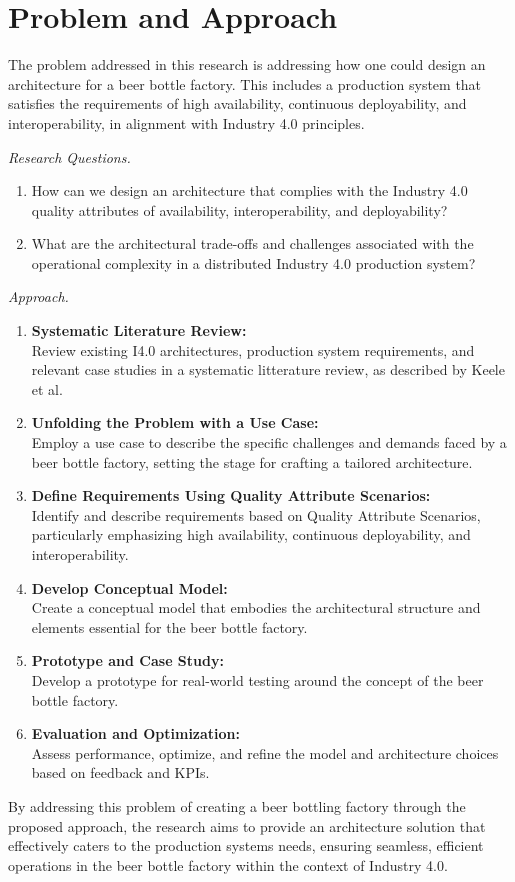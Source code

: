 \section{Problem and Approach}

\label{sec:problem}

The problem addressed in this research is addressing how one could design an architecture for a beer bottle factory. This includes a production system that satisfies the requirements of high availability, continuous deployability, and interoperability, in alignment with Industry 4.0 principles.

\emph{Research Questions.}
\begin{enumerate}
    \item How can we design an architecture that complies with the Industry 4.0 quality attributes of availability, interoperability, and deployability?
    \item What are the architectural trade-offs and challenges associated with the operational complexity in a distributed Industry 4.0 production system?
\end{enumerate}

\emph{Approach.}
\begin{enumerate}
    \item \textbf{Systematic Literature Review:}\\
    Review existing I4.0 architectures, production system requirements, and relevant case studies in a systematic litterature review, as described by Keele et al. \cite{keele2007guidelines}
    \item \textbf{Unfolding the Problem with a Use Case:}\\
    Employ a use case to describe the specific challenges and demands faced by a beer bottle factory, setting the stage for crafting a tailored architecture.
    \item \textbf{Define Requirements Using Quality Attribute Scenarios:}\\
    Identify and describe requirements based on Quality Attribute Scenarios, particularly emphasizing high availability, continuous deployability, and interoperability.
    \item \textbf{Develop Conceptual Model:}\\
    Create a conceptual model that embodies the architectural structure and elements essential for the beer bottle factory.
    \item \textbf{Prototype and Case Study:}\\
    Develop a prototype for real-world testing around the concept of the beer bottle factory.
    \item \textbf{Evaluation and Optimization:}\\
    Assess performance, optimize, and refine the model and architecture choices based on feedback and KPIs.
\end{enumerate}

By addressing this problem of creating a beer bottling factory through the proposed approach, the research aims to provide an architecture solution that effectively caters to the production systems needs, ensuring seamless, efficient operations in the beer bottle factory within the context of Industry 4.0.
